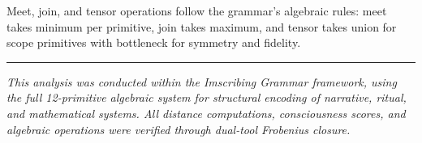 \documentclass[12pt,a4paper]{article}
\begin{document}
Meet, join, and tensor operations follow the grammar's algebraic rules: meet takes minimum per primitive, join takes maximum, and tensor takes union for scope primitives with bottleneck for symmetry and fidelity.

\begin{center}
\rule{0.5\textwidth}{0.4pt}
\end{center}

\emph{This analysis was conducted within the Imscribing Grammar framework, using the full 12-primitive algebraic system for structural encoding of narrative, ritual, and mathematical systems. All distance computations, consciousness scores, and algebraic operations were verified through dual-tool Frobenius closure.}
\end{document}
